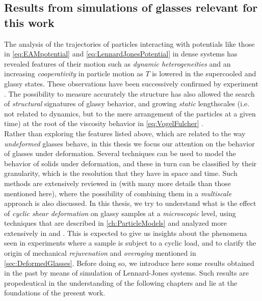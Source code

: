 \subsection{Results from simulations of glasses relevant for this work \label{sec:PreviousWorkOnOveragingAndRejuvenation}}
The analysis of the trajectories of particles interacting with potentials like those in \autoref{eq:EAMpotential} and \autoref{eq:LennardJonesPotential} in dense systems has revealed features of their motion such as \emph{dynamic heterogeneities} and an increasing \emph{cooperativity} in particle motion as $T$ is lowered in the supercooled and glassy states. These observations have been successively confirmed by experiment \cite{berthier2005direct}. The possibility to measure accurately the structure has also allowed the search of \emph{structural} signatures of glassy behavior, and growing \emph{static} lengthscales (i.e. not related to dynamics, but to the mere arrangement of the particles at a given time) at the root of the viscosity behavior in \autoref{eq:VogelFulcher} \cite{berthier2011theoretical}. \\
Rather than exploring the features listed above, which are related to the way \emph{undeformed} glasses behave, in this thesis we focus our attention on the behavior of glasses under deformation. 
Several techniques can be used to model the behavior of solids under deformation, and these in turn can be classified by their granularity, which is the resolution that they have in space and time. Such methods are extensively reviewed in \cite{rodney2011modeling} (with many more details than those mentioned here), where the possibility of combining them in a \emph{multiscale} approach is also discussed.
In this thesis, we try to understand what is the effect of \emph{cyclic shear deformation} on glassy samples at a \emph{microscopic} level, using techniques that are described in \autoref{ch:ParticleModels} and analyzed more extensively in \cite{rodney2011modeling} and \cite{falk2010simulating}. 
This is expected to give us insights about the phenomena seen in experiments where a sample is subject to a cyclic load, and to clarify the origin of mechanical \emph{rejuvenation} and \emph{overaging} mentioned in \autoref{sec:DeformedGlasses}.
Before doing so, we introduce here some results obtained in the past by means of simulation of Lennard-Jones systems. Such results are propedeutical in the understanding of the following chapters and lie at the foundations of the present work.

